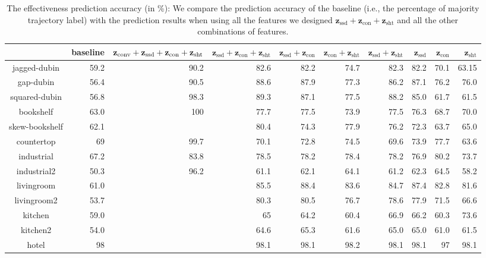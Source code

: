 \documentclass[letterpaper, 10 pt, conference]{ieeeconf}  %
\newcommand{\fssd}{\mbox{$\mathbf z_{\text{ssd}}$}}
\newcommand{\fcon}{\mbox{$\mathbf z_{\text{con}}$}}
\newcommand{\fsht}{\mbox{$\mathbf z_{\text{sht}}$}}
\begin{document}
\begin{table}[tbp]
\centering
\begin{tabular}{|c|r|r|r|r|r|r|r|r|r|}
\hline 
 & baseline & ${\bf z}_\textrm{conv} +\fssd+\fcon+\fsht$  & $\fssd+\fcon+\fsht$ & $\fssd+\fcon$ & $\fcon+\fsht$ & $\fssd+\fsht$ & $\fssd$ & $\fcon$ & $\fsht$ \\ \hline \hline
jagged-dubin & 59.2 & 90.2  & 82.6	& 82.2 & 74.7 & 82.3 & 82.2 & 70.1 & 63.15 \\ \hline
gap-dubin & 56.4 & 90.5 & 88.6 & 87.9 & 77.3 & 86.2 & 87.1 & 76.2 & 76.0 \\ \hline
squared-dubin & 56.8 & 98.3 & 89.3 & 	87.1 & 	77.5 &	88.2 &	85.0 &	 61.7	& 61.5 \\ \hline \hline

bookshelf & 63.0 & 100 & 77.7 & 	77.5 &	73.9 &	77.5 &	76.3 &	68.7 & 70.0 \\ \hline
skew-bookshelf & 62.1 & & 80.4 &	74.3 & 	77.9 & 	76.2 &	72.3 &	63.7 &	65.0 \\ \hline
countertop & 69 & 99.7 & 70.1	& 72.8 & 	74.5	 & 69.6 & 	73.9 &	77.7 &	63.6 \\ \hline
industrial & 67.2 & 83.8 & 78.5 &	78.2 &	78.4 &	78.2 &	76.9 &	80.2 & 	73.7 \\ \hline
industrial2 & 50.3 & 96.2 & 61.1 & 	62.1	 & 64.1 &	61.2 & 	62.3 & 	64.5 &	58.2 \\ \hline \hline

livingroom & 61.0 & & 85.5	& 88.4 &	 83.6 &	84.7 &	87.4 & 	82.8 &	81.6 \\ \hline
livingroom2 & 53.7 & & 80.3 &	 80.5	& 76.7 &	 78.6 &	77.9 & 	71.5 & 	66.6 \\ \hline
kitchen & 59.0 & & 65 & 	64.2 & 	60.4 &	66.9 & 	66.2 & 	60.3 & 	73.6 \\ \hline
kitchen2 & 54.0 & & 64.6 &	65.3 & 	61.6 & 	65.0 & 	65.0 & 	61.0 &	61.5 \\ \hline
hotel & 98 & & 98.1 &	98.1 & 	98.2 &	98.1 &	98.1 &	97	& 98.1 \\ \hline
\end{tabular}
\caption{The effectiveness prediction accuracy (in \%): We compare the prediction accuracy of the baseline (i.e., the percentage of majority trajectory label) with the prediction results when using all the features we designed $\fssd+\fcon+\fsht$ and all the other combinations of features.}
\label{tab:result}
\end{table}
\end{document}
